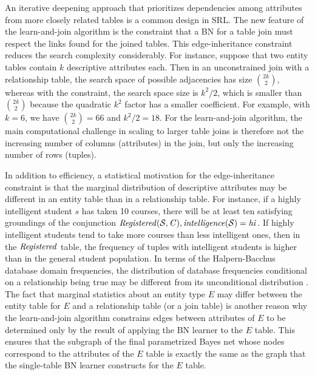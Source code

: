 \documentclass[letterpaper]{article}
\begin{document}
An iterative deepening approach that prioritizes dependencies among attributes from more closely related tables is a common design in SRL. The new feature of the learn-and-join algorithm is the constraint that a BN for a table join must respect the links found for the joined tables. This edge-inheritance constraint reduces the search complexity considerably. For instance, suppose that two entity tables contain $k$ descriptive attributes each. Then in an unconstrained join with a relationship table, the search space of possible adjacencies has size $\binom{2k}{2}$, whereas with the constraint, the search space size is $k^{2}/2$, which is smaller than $\binom{2k}{2}$ because the quadratic $k^{2}$ factor has a smaller coefficient. For example, with $k=6$, we have $\binom{2k}{2} = 66$ and $k^{2}/2=18$. For the learn-and-join algorithm, the main computational challenge in scaling to larger table joins is therefore not the increasing number of columns (attributes) in the join, but only the increasing number of rows (tuples).

In addition to efficiency, a statistical motivation for the edge-inheritance constraint is that the marginal distribution of descriptive attributes may be different in an entity table than in a relationship table.
For instance, if a highly intelligent student $s$ has taken 10 courses, there will be at least ten satisfying groundings of the conjunction $\it{Registered}(\S,C), \it{intelligence}(\S) = \it{hi}$. If highly intelligent students tend to take more courses than less intelligent ones, then in the $\it{Registered}$ table, the frequency of tuples with intelligent students is higher than in the general student population. 
In terms of the Halpern-Bacchus database domain frequencies, the distribution of database frequencies conditional on a relationship being true may be different from its unconditional distribution \cite{Halpern90,Bacchus90}.
The fact that marginal statistics about an entity type $E$ may differ between the entity table for $E$ and a relationship table (or a join table) is another reason why the learn-and-join algorithm constrains edges between attributes of $E$ to be determined only by the result of applying the BN learner to the $E$ table. This ensures that the subgraph of the final parametrized Bayes net whose nodes correspond to the attributes of the $E$ table is exactly the same as the graph that the single-table BN learner constructs for the $E$ table.
\end{document}
